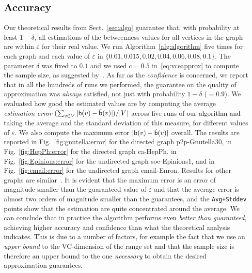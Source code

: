 \subsection{Accuracy}\label{sec:accuracy}
Our theoretical results from Sect.~\ref{sec:algo} guarantee that, with probability
at least $1-\delta$, all estimations of the betweenness values for all vertices
in the graph are within $\varepsilon$ for their real value. %
We run Algorithm~\ref{alg:algorithm} five times for each graph and each value of
$\varepsilon$ in $\{0.01, 0.015, 0.02, 0.04, 0.06, 0.08, 0.1\}$. The parameter
$\delta$ was fixed to $0.1$ and we used $c=0.5$ in~\eqref{eq:vceapprox} to
compute the sample size, as suggested by~\citet{LofflerP09}. As far as the
\emph{confidence} is concerned, we report that in all the hundreds of runs we
performed, the guarantee on the quality of approximation was \emph{always} satisfied, not just
with probability $1-\delta$ ($=0.9$). We evaluated how good the estimated values
are by computing the average \emph{estimation error} $(\sum_{v\in
V}|\mathsf{b}(v)-\tilde{\mathsf{b}}(v)|)/|V|$ across five runs of our algorithm and taking
the average and the standard deviation of this measure, for different values of
$\varepsilon$. We also compute the maximum error $|\mathsf{b}(v)-\tilde{\mathsf{b}}(v)|$
overall. The results are reported in Fig.~\ref{fig:gnutella:error} for the directed
graph p2p-Gnutella30, %
\ifproof
in Fig.~\ref{fig:HepPh:error} for the directed graph ca-HepPh, in
Fig.~\ref{fig:Epinions:error} for the undirected graph soc-Epinions1, %
\fi
and in Fig.~\ref{fig:email:error} for the undirected graph
email-Enron. %
\ifproof
\else
Results for other graphs are similar~\citep{RiondatoK13}. %
\fi
It is
evident that the maximum error is an error of magnitude smaller than the
guaranteed value of $\varepsilon$ and that the average error is almost two
orders of magnitude smaller than the guarantees, and the \texttt{Avg+Stddev}
points show that the estimation are quite concentrated around the
average. We can conclude that in practice the algorithm performs even \emph{better
than guaranteed}, achieving higher accuracy and confidence than what the
theoretical analysis indicates. This is due to a number of factors, for example the
fact that we use an \emph{upper bound} to the VC-dimension of the range set and
that the sample size is therefore an upper bound to the one \emph{necessary} to
obtain the desired approximation guarantees.



